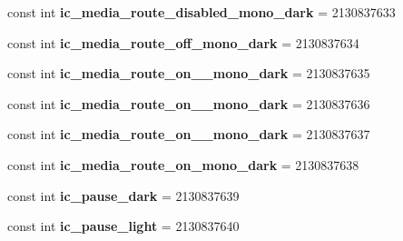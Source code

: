\begin{DoxyCompactItemize}
const int {\bfseries ic\+\_\+media\+\_\+route\+\_\+disabled\+\_\+mono\+\_\+dark} = 2130837633
\item 
\mbox{\label{class_sample_app_1_1_droid_1_1_resource_1_1_drawable_ad47a3fe880fc04d94c8fe2ac98f10628}} 
const int {\bfseries ic\+\_\+media\+\_\+route\+\_\+off\+\_\+mono\+\_\+dark} = 2130837634
\item 
\mbox{\label{class_sample_app_1_1_droid_1_1_resource_1_1_drawable_a9b1b3180af55b14c305ca14231683f44}} 
const int {\bfseries ic\+\_\+media\+\_\+route\+\_\+on\+\_\+\_\+mono\+\_\+dark} = 2130837635
\item 
\mbox{\label{class_sample_app_1_1_droid_1_1_resource_1_1_drawable_a74da8ce912f7772db4ee7396312eb107}} 
const int {\bfseries ic\+\_\+media\+\_\+route\+\_\+on\+\_\+\_\+mono\+\_\+dark} = 2130837636
\item 
\mbox{\label{class_sample_app_1_1_droid_1_1_resource_1_1_drawable_a996aba0739419cb08a09d59a7943b13f}} 
const int {\bfseries ic\+\_\+media\+\_\+route\+\_\+on\+\_\+\_\+mono\+\_\+dark} = 2130837637
\item 
\mbox{\label{class_sample_app_1_1_droid_1_1_resource_1_1_drawable_a27a6d3c6438339d73b9a48214c503679}} 
const int {\bfseries ic\+\_\+media\+\_\+route\+\_\+on\+\_\+mono\+\_\+dark} = 2130837638
\item 
\mbox{\label{class_sample_app_1_1_droid_1_1_resource_1_1_drawable_a96ee83b1bfb648c8d31ed2ae52bdc3d9}} 
const int {\bfseries ic\+\_\+pause\+\_\+dark} = 2130837639
\item 
\mbox{\label{class_sample_app_1_1_droid_1_1_resource_1_1_drawable_aa9d8a7111c3e19f972be4f31812015af}} 
const int {\bfseries ic\+\_\+pause\+\_\+light} = 2130837640
\item 
\mbox{\label{class_sample_app_1_1_droid_1_1_resource_1_1_drawable_aec77818e51e7b8a5cfcc70cc9c2a66e1}} 

\end{DoxyCompactItemize}
